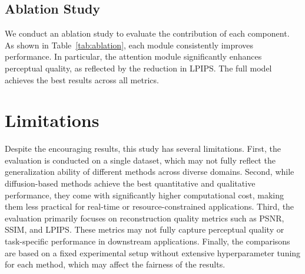 \subsection{Ablation Study}

We conduct an ablation study to evaluate the contribution of each component. 
As shown in Table~\ref{tab:ablation}, each module consistently improves performance. 
In particular, the attention module significantly enhances perceptual quality, 
as reflected by the reduction in LPIPS. The full model achieves the best results 
across all metrics.


\section{Limitations}

Despite the encouraging results, this study has several limitations. 
First, the evaluation is conducted on a single dataset, which may not fully reflect 
the generalization ability of different methods across diverse domains. 
%
Second, while diffusion-based methods achieve the best quantitative and qualitative 
performance, they come with significantly higher computational cost, making them 
less practical for real-time or resource-constrained applications. 
%
Third, the evaluation primarily focuses on reconstruction quality metrics such as PSNR, SSIM, and LPIPS. These metrics may not fully capture perceptual quality or task-specific performance in downstream applications. 
%
Finally, the comparisons are based on a fixed experimental setup without extensive 
hyperparameter tuning for each method, which may affect the fairness of the results.


